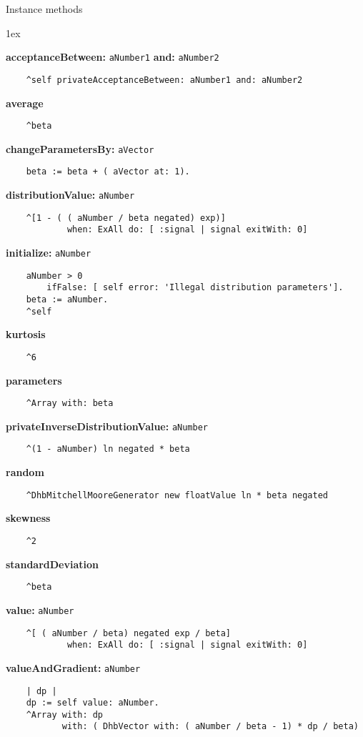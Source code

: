 Instance methods
{\parskip 1ex\par\noindent}
{\bf acceptanceBetween:} {\tt aNumber1} {\bf and:} {\tt aNumber2}
\begin{verbatim}
    ^self privateAcceptanceBetween: aNumber1 and: aNumber2

\end{verbatim}
{\bf average}
\begin{verbatim}
    ^beta

\end{verbatim}
{\bf changeParametersBy:} {\tt aVector}
\begin{verbatim}
    beta := beta + ( aVector at: 1).

\end{verbatim}
{\bf distributionValue:} {\tt aNumber}
\begin{verbatim}
    ^[1 - ( ( aNumber / beta negated) exp)]
            when: ExAll do: [ :signal | signal exitWith: 0]

\end{verbatim}
{\bf initialize:} {\tt aNumber}
\begin{verbatim}
    aNumber > 0
        ifFalse: [ self error: 'Illegal distribution parameters'].
    beta := aNumber.
    ^self

\end{verbatim}
{\bf kurtosis}
\begin{verbatim}
    ^6

\end{verbatim}
{\bf parameters}
\begin{verbatim}
    ^Array with: beta

\end{verbatim}
{\bf privateInverseDistributionValue:} {\tt aNumber}
\begin{verbatim}
    ^(1 - aNumber) ln negated * beta

\end{verbatim}
{\bf random}
\begin{verbatim}
    ^DhbMitchellMooreGenerator new floatValue ln * beta negated

\end{verbatim}
{\bf skewness}
\begin{verbatim}
    ^2

\end{verbatim}
{\bf standardDeviation}
\begin{verbatim}
    ^beta

\end{verbatim}
{\bf value:} {\tt aNumber}
\begin{verbatim}
    ^[ ( aNumber / beta) negated exp / beta]
            when: ExAll do: [ :signal | signal exitWith: 0]

\end{verbatim}
{\bf valueAndGradient:} {\tt aNumber}
\begin{verbatim}
    | dp |
    dp := self value: aNumber.
    ^Array with: dp
           with: ( DhbVector with: ( aNumber / beta - 1) * dp / beta)

\end{verbatim}

